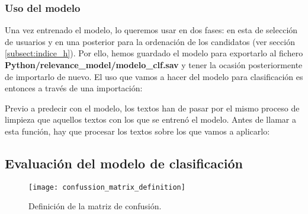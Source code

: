 \subsubsection{Uso del modelo}
Una vez entrenado el modelo, lo queremos usar en dos fases: en esta de selección de 
usuarios y en una posterior para la ordenación de los candidatos (ver sección 
\ref{subsect:indice_h}). Por ello, hemos guardado el modelo para 
exportarlo al fichero {\bf Python/relevance\_model/modelo\_clf.sav}
y tener la ocasión posteriormente de importarlo de nuevo. El uso que
vamos a hacer del modelo para clasificación es entonces a través de 
una importación:


Previo a predecir con el modelo, los textos han de pasar por el mismo proceso de 
limpieza que aquellos textos con los que se entrenó el modelo. Antes de llamar
a esta función, hay que procesar los textos sobre los que vamos a aplicarlo:


\subsection{Evaluación del modelo de clasificación}
\label{sect:ajuste_modelo_contenido_tuit}

\begin{wrapfigure}[14]{L}{0.5\textwidth}
\texttt{[image: confussion\_matrix\_definition]}
\caption{Definición de la matriz de confusión.}\label{fig:confussion_matrix_definition}
\end{wrapfigure} 

